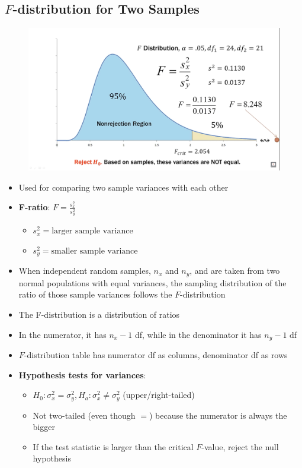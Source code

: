\documentclass{article}
\begin{document}
\subsection{$F$-distribution for Two Samples}

\begin{figure}[H]
    \centering
    \includegraphics[width=1.0\linewidth]{ftestexample.png}
\end{figure}

\begin{itemize}
    \item Used for comparing two sample variances with each other
    \item \textbf{F-ratio}: $F=\frac{s_x^2}{s_y^2}$
    \begin{itemize}
        \item $s_x^2=\text{larger sample variance}$
        \item $s_y^2=\text{smaller sample variance}$
    \end{itemize}
    \item When independent random samples, $n_x$ and $n_y$, and are taken from two normal populations with equal variances, the sampling distribution of the ratio of those sample variances follows the $F$-distribution 
    \item The F-distribution is a distribution of ratios
    \item In the numerator, it has $n_x-1$ df, while in the denominator it has $n_y-1$ df
    \item $F$-distribution table has numerator df as columns, denominator df as rows
    \item \textbf{Hypothesis tests for variances}:
    \begin{itemize}
        \item $H_0: \sigma_x^2=\sigma_y^2, H_a: \sigma_x^2\ne \sigma_y^2$ (upper/right-tailed)
        \item Not two-tailed (even though $=$) because the numerator is always the bigger
        \item If the test statistic is larger than the critical $F$-value, reject the null hypothesis
    \end{itemize}
\end{itemize}
\end{document}
